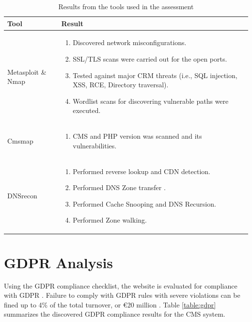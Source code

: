 \begingroup
\centering
\setlength{\tabcolsep}{6.5pt} %
\renewcommand{\arraystretch}{1.8} %
\begin{longtable}{ |p{5cm}| p{10cm} |}
\caption{Results from the tools used in the assessment}
    \label{table:tools}
\hline
\rowcolor{grey!15}
\textbf{Tool}  & \textbf{Result}\\
\hline
Metasploit \& Nmap &  
\vspace{-\baselineskip}
\begin{enumerate}
    \item Discovered network misconfigurations.
    \item SSL/TLS scans were carried out for the open ports.
    \item Tested against major CRM threats (i.e., SQL injection, XSS, RCE, Directory traversal).
    \item Wordlist scans for discovering vulnerable paths were executed.
\end{enumerate}\\
\hline
Cmsmap &  
\vspace{-\baselineskip}
\begin{enumerate}
    \item CMS and PHP version was scanned and its vulnerabilities.
\end{enumerate}\\
\hline
DNSrecon &  
\vspace{-\baselineskip}
\begin{enumerate}
    \item Performed reverse lookup and CDN detection.
    \item Performed DNS Zone transfer \citep[p.~193]{zone_transfer}.
    \item Performed Cache Snooping and DNS Recursion.
    \item Performed Zone walking.
\end{enumerate}\\
\hline
\end{longtable}
\endgroup

\section{GDPR Analysis}
Using the GDPR compliance checklist, the website is evaluated for compliance with GDPR \citep{gdpr_checklist}. Failure to comply with GDPR rules with severe violations can be fined up to 4\% of the total turnover, or €20 million \citep[p.~32]{eu_fines}. Table \ref{table:gdpr} summarizes the discovered GDPR compliance results for the CMS system.



